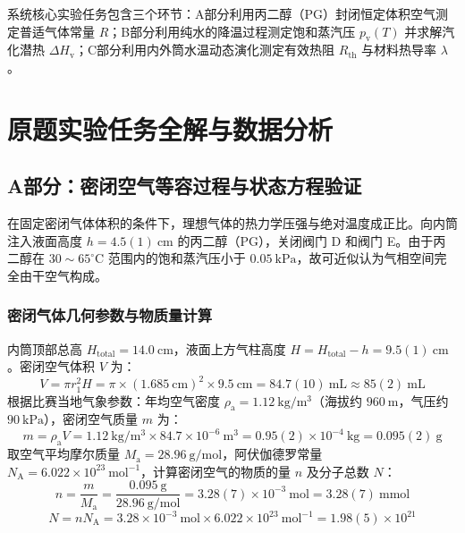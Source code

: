 \documentclass[10pt, a4paper]{ctexart}
\begin{document}
系统核心实验任务包含三个环节：A部分利用丙二醇（PG）封闭恒定体积空气测定普适气体常量 $R$；B部分利用纯水的降温过程测定饱和蒸汽压 $p_{\mathrm{v}}(T)$ 并求解汽化潜热 $\Delta H_{\mathrm{v}}$；C部分利用内外筒水温动态演化测定有效热阻 $R_{\mathrm{th}}$ 与材料热导率 $\lambda$。

\section{原题实验任务全解与数据分析}

\subsection{A部分：密闭空气等容过程与状态方程验证}
在固定密闭气体体积的条件下，理想气体的热力学压强与绝对温度成正比。向内筒注入液面高度 $h = 4.5(1)\ \mathrm{cm}$ 的丙二醇（PG），关闭阀门 D 和阀门 E。由于丙二醇在 $30\sim 65^\circ\mathrm{C}$ 范围内的饱和蒸汽压小于 $0.05\ \mathrm{kPa}$，故可近似认为气相空间完全由干空气构成。

\subsubsection{密闭气体几何参数与物质量计算}
内筒顶部总高 $H_{\mathrm{total}} = 14.0\ \mathrm{cm}$，液面上方气柱高度 $H = H_{\mathrm{total}} - h = 9.5(1)\ \mathrm{cm}$。密闭空气体积 $V$ 为：
\begin{equation}
V = \pi r_1^2 H = \pi \times (1.685\ \mathrm{cm})^2 \times 9.5\ \mathrm{cm} = 84.7(10)\ \mathrm{mL} \approx 85(2)\ \mathrm{mL}
\label{eq:volume}
\end{equation}
根据比赛当地气象参数：年均空气密度 $\rho_{\mathrm{a}} = 1.12\ \mathrm{kg/m^3}$（海拔约 $960\ \mathrm{m}$，气压约 $90\ \mathrm{kPa}$），密闭空气质量 $m$ 为：
\begin{equation}
m = \rho_{\mathrm{a}} V = 1.12\ \mathrm{kg/m^3} \times 84.7\times 10^{-6}\ \mathrm{m^3} = 0.95(2)\times 10^{-4}\ \mathrm{kg} = 0.095(2)\ \mathrm{g}
\end{equation}
取空气平均摩尔质量 $M_{\mathrm{a}} = 28.96\ \mathrm{g/mol}$，阿伏伽德罗常量 $N_{\mathrm{A}} = 6.022\times 10^{23}\ \mathrm{mol^{-1}}$，计算密闭空气的物质的量 $n$ 及分子总数 $N$：
\begin{equation}
n = \frac{m}{M_{\mathrm{a}}} = \frac{0.095\ \mathrm{g}}{28.96\ \mathrm{g/mol}} = 3.28(7)\times 10^{-3}\ \mathrm{mol} = 3.28(7)\ \mathrm{mmol}
\end{equation}
\begin{equation}
N = n N_{\mathrm{A}} = 3.28\times 10^{-3}\ \mathrm{mol} \times 6.022\times 10^{23}\ \mathrm{mol^{-1}} = 1.98(5)\times 10^{21}
\end{equation}
\end{document}
